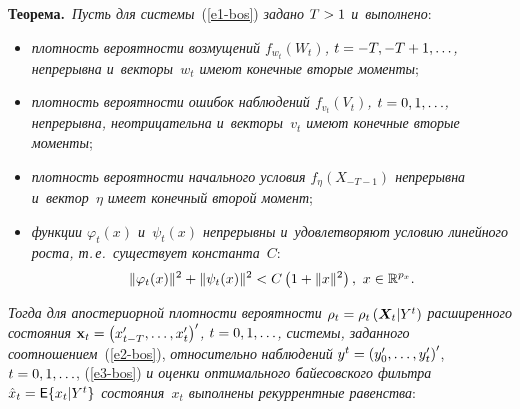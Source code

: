 \begin{multicols}{2}
     \noindent 
     \textbf{Теорема.}\ \textit{Пусть для сис\-те\-мы}~(\ref{e1-bos}) 
\textit{задано $T\hm>1$ и~вы\-пол\-нено}:
     \begin{itemize}
\item \textit{плотность ве\-ро\-ят\-ности возмущений $f_{w_t}(W_t)$, $t\hm= -T, -T+1, \ldots$, 
непрерывна и~векторы~$w_t$ имеют конечные вторые мо\-менты};
\item \textit{плотность ве\-ро\-ят\-ности ошибок наблюдений $f_{v_t}(V_t)$, 
$t\hm= 0,1,\ldots$, непрерывна, не\-от\-ри\-ца\-тель\-на и~векторы~$v_t$ имеют конечные вторые мо\-менты};
\item \textit{плотность ве\-ро\-ят\-ности начального условия $f_\eta(X_{-T-1})$ 
не\-пре\-рыв\-на и~вектор~$\eta$ имеет конечный второй мо\-мент};
\item \textit{функции $\varphi_t(x)$ и~$\psi_t(x)$ не\-пре\-рыв\-ны и~удовле\-тво\-ря\-ют 
условию линейного рос\-та, т.\,е.\ существует константа}~$C$: 
$$
\| \varphi_t(x)\|^2\hm+ \| \psi_t(x)\|^2\hm< C\left(1\hm+ \| x\|^2\right),\ x\in \mathbb{R}^{p_x}.
$$
\end{itemize}
     
     \textit{Тогда для апостериорной плот\-ности ве\-ро\-ят\-ности 
$\rho_t\hm= \rho_t\left(\bm{X}_t\vert Y^t\right)$ расширенного со\-сто\-яния 
$\mathbf{x}_t\hm= \left( x^\prime_{t-T}, \ldots , %
x_t^\prime\right)^\prime$, $t\hm= 0,1,\ldots$, сис\-те\-мы, заданного 
соотношением}~(\ref{e2-bos}), \textit{относительно} \mbox{\textit{наблюдений}} $y^t\hm= 
\left( y_0^\prime, \ldots , y_t^\prime\right)^\prime$, $t\hm= 0,1,\ldots$, 
 (\ref{e3-bos}) \textit{и оценки оптимального байесовского фильт\-ра 
$\hat{x}_t\hm= {\sf E} \{ x_t\vert Y^t\}$  
со\-сто\-яния~$x_t$ выполнены рекуррентные ра\-вен\-ства}:

\pagebreak


\end{multicols}
